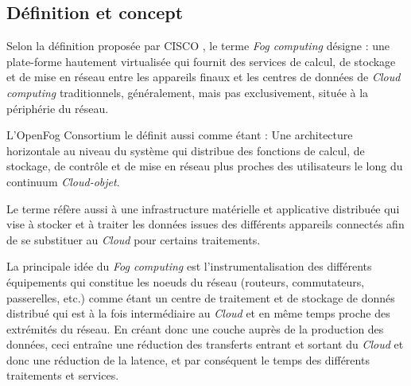 \subsection{Définition et concept}
Selon la définition proposée par CISCO \cite{bonomi2012}, le terme \emph{Fog computing} désigne : \og{}une plate-forme hautement virtualisée qui fournit des services de calcul, de stockage et de mise en réseau entre les appareils finaux et les centres de données de \emph{Cloud computing} traditionnels, généralement, mais pas exclusivement, située à la périphérie du réseau\fg{}.\par
L'OpenFog Consortium \cite{OpenFog2017} le définit aussi comme étant : \og{} Une architecture horizontale au niveau du système qui distribue des fonctions de calcul, de stockage, de contrôle et de mise en réseau plus proches des utilisateurs le long du continuum \emph{Cloud-objet}\fg{}.\par
Le terme réfère aussi à une infrastructure matérielle et applicative distribuée qui vise à stocker et à traiter les données issues des différents appareils connectés afin de se substituer au \emph{Cloud} pour certains traitements.\par
La principale idée du \emph{Fog computing} est l'instrumentalisation des différents équipements qui constitue les noeuds du réseau (routeurs, commutateurs, passerelles, etc.) comme étant un centre de traitement et de stockage de donnés distribué qui est à la fois intermédiaire au \emph{Cloud} et en même temps proche des extrémités du réseau.
En créant donc une couche auprès de la production des données, ceci entraîne une réduction des transferts entrant et sortant du \emph{Cloud} et donc une réduction de la latence, et par conséquent le temps des différents traitements et services.
